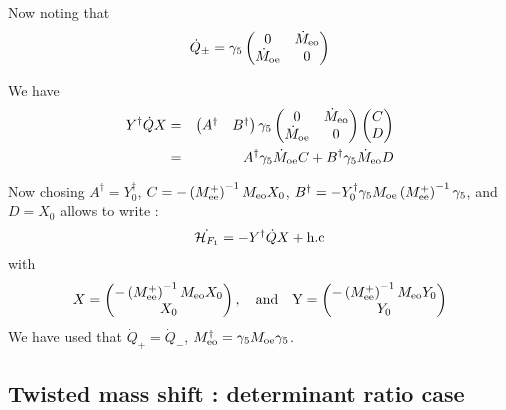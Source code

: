 \documentclass{article}[12pt]
\begin{document}
Now noting that  
\begin{equation}
  \dot{Q}_{\pm} =  \gamma_5 \begin{pmatrix} 
 0  & \dot{M}_{\rm{eo}} \\
\dot{M}_{\rm{oe}} & 0\\
\end{pmatrix}
\end{equation}

We have 
\begin{eqnarray}
  Y ^{\dagger} \dot{Q} X  &=& \begin{pmatrix} A^\dagger &
    B^\dagger \end{pmatrix} \gamma_5 \begin{pmatrix} 
 0  & \dot{M}_{\rm{eo}} \\
\dot{M}_{\rm{oe}} & 0\\
\end{pmatrix}  \begin{pmatrix} C \\  D \end{pmatrix} \\
&=&  A^\dagger \gamma_5 \dot{M}_{\rm{oe}}  C + B^\dagger \gamma_5 \dot{M}_{\rm{eo}} D
\end{eqnarray}

Now chosing $A^\dagger= Y^\dagger_0 $,
$C=-\left(M^{+}_{\rm{ee}}\right)^{-1} M_{\rm{eo}} X_0 $, $B^\dagger=
- Y_0^\dagger \gamma_5 M_{\rm{oe}}
     \left(M^{+}_{\rm{ee}}\right)^{-1} \gamma_5$, and $D= X_0$ allows to write :
\begin{equation}
\dot{\mathcal{H}_{F_1}} = -  Y^\dagger \dot{Q} X
  + \rm{h.c} 
\end{equation} 
with 
\begin{equation}
X=\begin{pmatrix}-\left(M^{+}_{\rm{ee}}\right)^{-1} M_{\rm{eo}} X_0
  \\ X_0 \end{pmatrix},\quad \rm{and} \quad Y=\begin{pmatrix}-
   \left(M^{+}_{\rm{ee}}\right)^{-1} M_{\rm{eo}} Y_0
  \\ Y_0 \end{pmatrix}
\end{equation}
We have used that   $\dot{Q}_+= \dot{Q}_-$, $M_{\rm{eo}}^{\dagger}=
\gamma_5 M_{\rm{oe}} \gamma_5$.

\subsection{Twisted mass shift : determinant ratio case}
\end{document}
